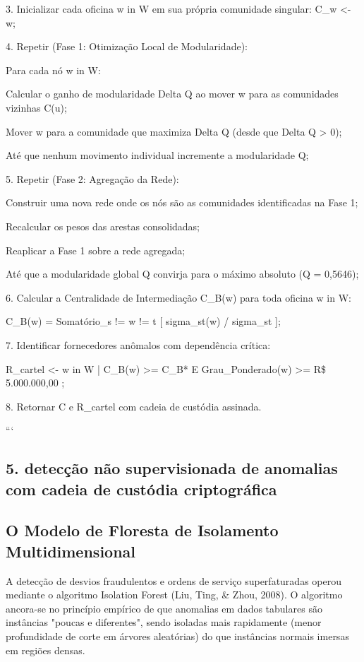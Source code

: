 \documentclass[12pt,a4paper]{article}
\begin{document}
3. Inicializar cada oficina w in W em sua própria comunidade singular: C\_w <- {w};

4. Repetir (Fase 1: Otimização Local de Modularidade):

Para cada nó w in W:

Calcular o ganho de modularidade Delta Q ao mover w para as comunidades vizinhas C(u);

Mover w para a comunidade que maximiza Delta Q (desde que Delta Q > 0);

Até que nenhum movimento individual incremente a modularidade Q;

5. Repetir (Fase 2: Agregação da Rede):

Construir uma nova rede onde os nós são as comunidades identificadas na Fase 1;

Recalcular os pesos das arestas consolidadas;

Reaplicar a Fase 1 sobre a rede agregada;

Até que a modularidade global Q convirja para o máximo absoluto (Q = 0,5646);

6. Calcular a Centralidade de Intermediação C\_B(w) para toda oficina w in W:

C\_B(w) = Somatório\_{s != w != t} [ sigma\_st(w) / sigma\_st ];

7. Identificar fornecedores anômalos com dependência crítica:

R\_cartel <- { w in W | C\_B(w) >= C\_B* E Grau\_Ponderado(w) >= R\$ 5.000.000,00 };

8. Retornar C e R\_cartel com cadeia de custódia assinada.

```


\subsection{5. detecção não supervisionada de anomalias com cadeia de custódia criptográfica}


\subsection{O Modelo de Floresta de Isolamento Multidimensional}

A detecção de desvios fraudulentos e ordens de serviço superfaturadas operou mediante o algoritmo Isolation Forest (Liu, Ting, \& Zhou, 2008). O algoritmo ancora-se no princípio empírico de que anomalias em dados tabulares são instâncias "poucas e diferentes", sendo isoladas mais rapidamente (menor profundidade de corte em árvores aleatórias) do que instâncias normais imersas em regiões densas.
\end{document}
